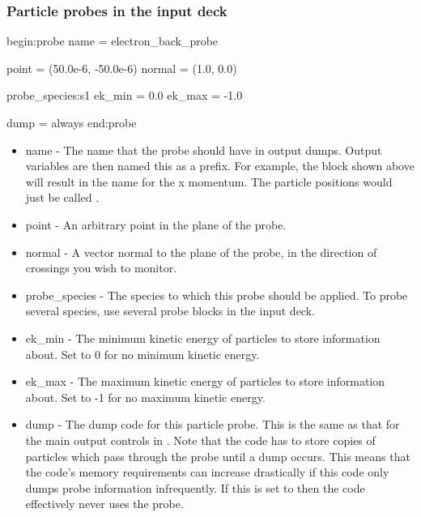 \subsubsection{Particle probes in the input deck}
\begin{boxverbatim}
begin:probe
   name = electron_back_probe

   point = (50.0e-6, -50.0e-6)
   normal = (1.0, 0.0)

   probe_species:s1
   ek_min = 0.0
   ek_max = -1.0

   dump = always
end:probe
\end{boxverbatim}
\begin{itemize}
\item name - The name that the probe should have in output dumps. Output
  variables are then named this as a prefix. For example, the block shown above
  will result in the name\linebreak {} for
  the x momentum. The particle positions would just be called\linebreak
  .
\item point - An arbitrary point in the plane of the probe.
\item normal - A vector normal to the plane of the probe, in the direction
  of crossings you wish to monitor.
\item probe\_species - The species to which this probe should be
  applied. To probe several species, use several probe blocks in the input
  deck.
\item ek\_min - The minimum kinetic energy of particles to store information
  about. Set to 0 for no minimum kinetic energy.
\item ek\_max - The maximum kinetic energy of particles to store information
  about. Set to -1 for no maximum kinetic energy.
\item dump - The dump code for this particle probe. This is the same as that
  for the main output controls in . Note that the code
  has to store copies of particles which pass through the probe until a dump
  occurs. This means that the code's memory requirements can increase
  drastically if this code only dumps probe information infrequently. If this
  is set to  then the code effectively never uses the probe.
\end{itemize}

